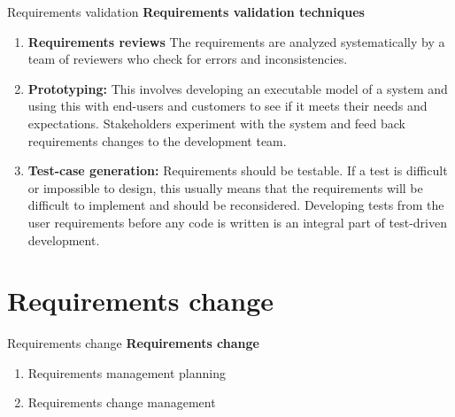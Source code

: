 \documentclass{beamer}
\begin{document}
\begin{frame}{Requirements validation}
\textbf{Requirements validation techniques }
\begin{enumerate}
	\item \textbf{Requirements reviews} The requirements are analyzed systematically by a team of reviewers who check for errors and inconsistencies.
	\item \textbf{Prototyping:} 
		This involves developing an executable model of a system and using this with end-users and customers to see if it meets their needs and expectations. Stakeholders experiment with the system and feed back requirements changes to the development team.
	\item \textbf{Test-case generation:} 
		Requirements should be testable. If a test is difficult or impossible to design, this usually means that the requirements will be difficult to implement and should be reconsidered. Developing tests from the user requirements before any code is written is an integral part of test-driven development.
\end{enumerate}
\end{frame}
\section{Requirements change}
\begin{frame}{Requirements change}
	\textbf{Requirements change}
	\begin{enumerate}
		\item Requirements management planning
		\item Requirements change management
	\end{enumerate}
\end{frame}
\end{document}
